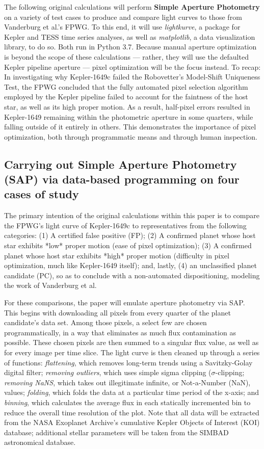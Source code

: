 \documentclass[onecolumn, 12pt]{article}
\begin{document}
The following original calculations will perform \textbf{Simple Aperture Photometry} on a variety of test cases to produce and compare light curves to those from Vanderburg et al.'s FPWG. To this end, it will use \textit{lightkurve}, a package for Kepler and TESS time series analyses, as well as \textit{matplotlib}, a data visualization library, to do so. Both run in Python 3.7. Because manual aperture optimization is beyond the scope of these calculations — rather, they will use the defaulted Kepler pipeline aperture — pixel optimization will be the focus instead. To recap: In investigating why Kepler-1649c failed the Robovetter's Model-Shift Uniqueness Test, the FPWG concluded that the fully automated pixel selection algorithm employed by the Kepler pipeline failed to account for the faintness of the host star, as well as its high proper motion. As a result, half-pixel errors resulted in Kepler-1649 remaining within the photometric aperture in some quarters, while falling outside of it entirely in others. This demonstrates the importance of pixel optimization, both through programmatic means and through human inspection.

\subsection{Carrying out Simple Aperture Photometry (SAP) via data-based programming on four cases of study}

The primary intention of the original calculations within this paper is to compare the FPWG's light curve of Kepler-1649c to representatives from the following categories: (1) A certified false positive (FP); (2) A confirmed planet whose host star exhibits *low* proper motion (ease of pixel optimization); (3) A confirmed planet whose host star exhibits *high* proper motion (difficulty in pixel optimization, much like Kepler-1649 itself); and, lastly, (4) an unclassified planet candidate (PC), so as to conclude with a non-automated dispositioning, modeling the work of Vanderburg et al.

For these comparisons, the paper will emulate aperture photometry via SAP. This begins with downloading all pixels from every quarter of the planet candidate's data set. Among those pixels, a select few are chosen programmatically, in a way that eliminates as much flux contamination as possible. These chosen pixels are then summed to a singular flux value, as well as for every image per time slice. The light curve is then cleaned up through a series of functions: \textit{flattening}, which removes long-term trends using a Savitzky-Golay digital filter; \textit{removing outliers}, which uses simple sigma clipping ($\sigma$-clipping; \textit{removing NaNS}, which takes out illegitimate infinite, or Not-a-Number (NaN), values; \textit{folding}, which folds the data at a particular time period of the x-axis; and \textit{binning}, which calculates the average flux in each statically incremented bin to reduce the overall time resolution of the plot. Note that all data will be extracted from the NASA Exoplanet Archive's cumulative Kepler Objects of Interest (KOI) database; additional stellar parameters will be taken from the SIMBAD astronomical database.
\end{document}
